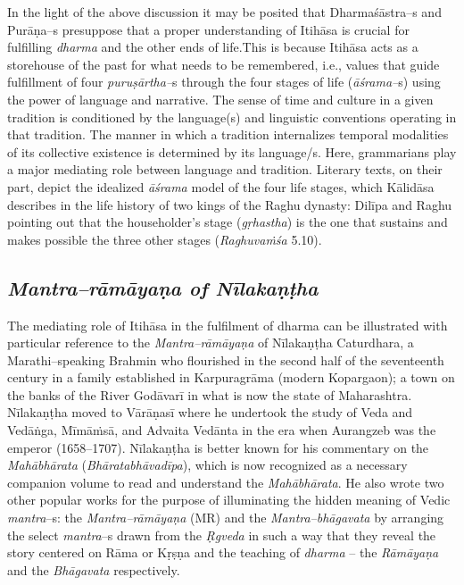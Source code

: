 In the light of the above discussion it may be posited that Dharmaśāstra–s and Purāṇa–s presuppose that a proper understanding of Itihāsa is crucial for fulfilling \textit{dharma} and the other ends of life.This is because Itihāsa acts as a storehouse of the past for what needs to be remembered, i.e., values that guide fulfillment of four \textit{puruṣārtha–}s through the four stages of life (\textit{āśrama–}s) using the power of language and narrative. The sense of time and culture in a given tradition is conditioned by the language(s) and linguistic conventions operating in that tradition. The manner in which a tradition internalizes temporal modalities of its collective existence is determined by its language/s. Here, grammarians play a major mediating role between language and tradition. Literary texts, on their part, depict the idealized \textit{āśrama} model of the four life stages, which Kālidāsa describes in the life history of two kings of the Raghu dynasty: Dilīpa and Raghu pointing out that the householder’s stage (\textit{gṛhastha}) is the one that sustains and makes possible the three other stages (\textit{Raghuvaṁśa} 5.10).

\subsection*{\textit{Mantra–rāmāyaṇa of Nīlakaṇṭha}}

The mediating role of Itihāsa in the fulfilment of dharma can be illustrated with particular reference to the \textit{Mantra–rāmāyaṇa} of Nīlakaṇṭha Caturdhara, a Marathi–speaking Brahmin who flourished in the second half of the seventeenth century in a family established in Karpuragrāma (modern Kopargaon); a town on the banks of the River Godāvarī in what is now the state of Maharashtra. Nīlakaṇṭha moved to Vārāṇasī where he undertook the study of Veda and Vedāṅga, Mīmāṁsā, and Advaita Vedānta in the era when Aurangzeb was the emperor (1658–1707). Nīlakaṇṭha is better known for his commentary on the \textit{Mahābhārata} (\textit{Bhāratabhāvadīpa}), which is now recognized as a necessary companion volume to read and understand the \textit{Mahābhārata}. He also wrote two other popular works for the purpose of illuminating the hidden meaning of Vedic \textit{mantra}–s: the \textit{Mantra–rāmāyaṇa} (MR) and the \textit{Mantra–bhāgavata} by arranging the select \textit{mantra}–s drawn from the \textit{Ṛgveda} in such a way that they reveal the story centered on Rāma or Kṛṣṇa and the teaching of \textit{dharma} – the \textit{Rāmāyaṇa} and the \textit{Bhāgavata} respectively.

